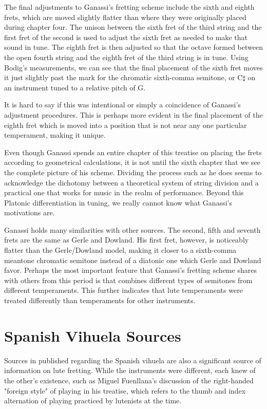 The final adjustments to Ganassi's fretting scheme include the sixth and eighth frets,
which are moved slightly flatter than where they were originally placed during chapter
four. The unison between the sixth fret of the third string and the first fret of the
second is used to adjust the sixth fret as needed to make that sound in tune.  The
eighth fret is then adjusted so that the octave formed between the open fourth string
and the eighth fret of the third string is in tune.  Using Bodig's measurements, we can
see that the final placement of the sixth fret moves it just slightly past the mark for
the chromatic sixth-comma semitone, or C$\sharp$ on an instrument tuned to a relative
pitch of G.

It is hard to say if this was intentional or simply a coincidence of Ganassi's
adjustment procedures.  This is perhaps more evident in the final placement of the
eighth fret which is moved into a position that is not near any one particular
temperament, making it unique.


Even though Ganassi spends an entire chapter of this treatise on placing the frets
according to geometrical calculations, it is not until the sixth chapter that we see
the complete picture of his scheme.  Dividing the process such as he does seems to
acknowledge the dichotomy between a theoretical system of string division and a
practical one that works for music in the realm of performance.  Beyond this Platonic
differentiation in tuning, we really cannot know what Ganassi's motivations are.

Ganassi holds many similarities with other sources.  The second, fifth and seventh
frets are the same as Gerle and Dowland.  His first fret, however, is noticeably
flatter than the Gerle/Dowland model, making it closer to a sixth-comma meantone
chromatic semitone instead of a diatonic one which Gerle and Dowland favor. Perhaps the
most important feature that Ganassi's fretting scheme shares with others from this
period is that combines different types of semitones from different temperaments.  This
further indicates that lute temperaments were treated differently than temperaments for
other instruments.

\section{Spanish Vihuela Sources}

Sources in published regarding the Spanish vihuela are also a significant source of information
on lute fretting.  While the instruments were different, each knew of the other's existence,
such as Miguel Fuenllana's discussion of the right-handed "foreign style" of playing in his
treatise, which refers to the thumb and index alternation of playing practiced by lutenists
at the time.

